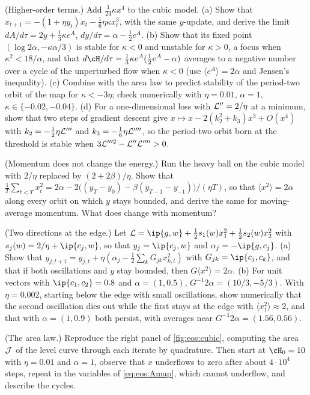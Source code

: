 \begin{refsection}
\begin{exercises}
\item \variation (Higher-order terms.) Add $\frac1{24}\kappa x^4$ to the cubic model. (a) Show that $x_{t+1}=-(1+\eta y_t)x_t-\frac16\eta\kappa x_t^3$, with the same $y$-update, and derive the limit $dA/d\tau=2y+\frac13\kappa e^A$, $dy/d\tau=\alpha-\frac12e^A$. (b) Show that its fixed point $(\log2\alpha,-\kappa\alpha/3)$ is stable for $\kappa<0$ and unstable for $\kappa>0$, a focus when $\kappa^2<18/\alpha$, and that $d\cH/d\tau=\frac13\kappa e^A(\frac12e^A-\alpha)$ averages to a negative number over a cycle of the unperturbed flow when $\kappa<0$ (use $\langle e^A\rangle=2\alpha$ and Jensen's inequality). (c) Combine with the area law to predict stability of the period-two orbit of the map for $\kappa<-3\eta$; check numerically with $\eta=0.01$, $\alpha=1$, $\kappa\in\{-0.02,-0.04\}$. (d) For a one-dimensional loss with $\mathcal{L}''=2/\eta$ at a minimum, show that two steps of gradient descent give $x\mapsto x-2(k_2^2+k_3)x^3+O(x^4)$ with $k_2=-\frac12\eta\mathcal{L}'''$ and $k_3=-\frac16\eta\mathcal{L}''''$, so the period-two orbit born at the threshold is stable when $3\mathcal{L}'''^2-\mathcal{L}''\mathcal{L}''''>0$.\label{ex:eos:quartic}

\item \variation (Momentum does not change the energy.) Run the heavy ball on the cubic model with $2/\eta$ replaced by $(2+2\beta)/\eta$. Show that $\frac1T\sum_{t<T}x_t^2=2\alpha-2\bigl((y_T-y_0)-\beta(y_{T-1}-y_{-1})\bigr)/(\eta T)$, so that $\langle x^2\rangle=2\alpha$ along every orbit on which $y$ stays bounded, and derive the same for moving-average momentum. What does change with momentum?\label{ex:eos:momentum}

\item \variation (Two directions at the edge.) Let $\Loss=\ip{g,w}+\frac12s_1(w)x_1^2+\frac12s_2(w)x_2^2$ with $s_j(w)=2/\eta+\ip{c_j,w}$, so that $y_j=\ip{c_j,w}$ and $\alpha_j=-\ip{g,c_j}$. (a) Show that $y_{j,t+1}=y_{j,t}+\eta(\alpha_j-\frac12\sum_kG_{jk}x_{k,t}^2)$ with $G_{jk}=\ip{c_j,c_k}$, and that if both oscillations and $y$ stay bounded, then $G\langle x^2\rangle=2\alpha$. (b) For unit vectors with $\ip{c_1,c_2}=0.8$ and $\alpha=(1,0.5)$, $G^{-1}2\alpha=(10/3,-5/3)$. With $\eta=0.002$, starting below the edge with small oscillations, show numerically that the second oscillation dies out while the first stays at the edge with $\langle x_1^2\rangle\approx2$, and that with $\alpha=(1,0.9)$ both persist, with averages near $G^{-1}2\alpha=(1.56,0.56)$.\label{ex:eos:two}

\item \simulation (The area law.) Reproduce the right panel of \cref{fig:eos:cubic}, computing the area $\mathcal{J}$ of the level curve through each iterate by quadrature. Then start at $\cH_0=10$ with $\eta=0.01$ and $\alpha=1$, observe that $x$ underflows to zero after about $4\cdot10^4$ steps, repeat in the variables of \eqref{eq:eos:Amap}, which cannot underflow, and describe the cycles.\label{ex:eos:area}


\end{exercises}
\end{refsection}
